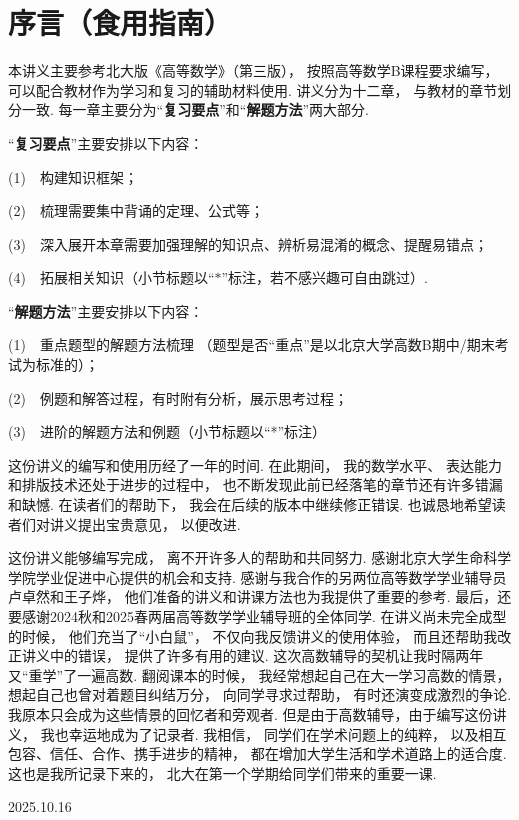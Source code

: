 \section*{序言（食用指南）}


本讲义主要参考北大版《高等数学》（第三版），
按照高等数学B课程要求编写，
可以配合教材作为学习和复习的辅助材料使用.
讲义分为十二章，
与教材的章节划分一致.
每一章主要分为“\textbf{复习要点}”和“\textbf{解题方法}”两大部分.
\vspace{1em}

“\textbf{复习要点}”主要安排以下内容：

(1)~~构建知识框架；

(2)~~梳理需要集中背诵的定理、公式等；

(3)~~深入展开本章需要加强理解的知识点、辨析易混淆的概念、提醒易错点；

(4)~~拓展相关知识（小节标题以“$*$”标注，若不感兴趣可自由跳过）.\vspace{1em}

“\textbf{解题方法}”主要安排以下内容：

(1)~~重点题型的解题方法梳理
（题型是否“重点”是以北京大学高数B期中/期末考试为标准的）；

(2)~~例题和解答过程，有时附有分析，展示思考过程；

(3)~~进阶的解题方法和例题（小节标题以“*”标注）\vspace{1em}

这份讲义的编写和使用历经了一年的时间.
在此期间，
我的数学水平、
表达能力和排版技术还处于进步的过程中，
也不断发现此前已经落笔的章节还有许多错漏和缺憾.
在读者们的帮助下，
我会在后续的版本中继续修正错误.
也诚恳地希望读者们对讲义提出宝贵意见，
以便改进.

这份讲义能够编写完成，
离不开许多人的帮助和共同努力.
感谢北京大学生命科学学院学业促进中心提供的机会和支持.
感谢与我合作的另两位高等数学学业辅导员卢卓然和王子烨，
他们准备的讲义和讲课方法也为我提供了重要的参考.
最后，还要感谢2024秋和2025春两届高等数学学业辅导班的全体同学.
在讲义尚未完全成型的时候，
他们充当了“小白鼠”，
不仅向我反馈讲义的使用体验，
而且还帮助我改正讲义中的错误，
提供了许多有用的建议.
这次高数辅导的契机让我时隔两年又“重学”了一遍高数.
翻阅课本的时候，
我经常想起自己在大一学习高数的情景，
想起自己也曾对着题目纠结万分，
向同学寻求过帮助，
有时还演变成激烈的争论.
我原本只会成为这些情景的回忆者和旁观者.
但是由于高数辅导，由于编写这份讲义，
我也幸运地成为了记录者.
我相信，
同学们在学术问题上的纯粹，
以及相互包容、信任、合作、携手进步的精神，
都在增加大学生活和学术道路上的适合度.
这也是我所记录下来的，
北大在第一个学期给同学们带来的重要一课.


\begin{flushright}
    2025.10.16
\end{flushright}